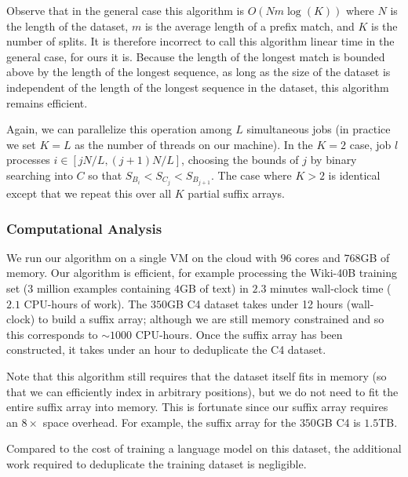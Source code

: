 Observe that in the general case this algorithm is $O(N m \log(K))$ where $N$ is the length
of the dataset, $m$ is the average length of a prefix match, and $K$ is the number of splits.
%
It is therefore incorrect to call this algorithm linear time in the general case, for ours it is.
%
Because the length of the longest match is bounded above by the length of the longest
sequence, as long as the size of the dataset is independent of the length of the 
longest sequence in the dataset, this algorithm remains efficient.

Again, we can parallelize this operation among $L$ simultaneous jobs 
(in practice we set $K=L$ as the number of threads on our machine).
%
In the $K=2$ case, job $l$ processes $i \in [jN/L, (j+1)N/L]$, choosing
the bounds of $j$ by binary searching into $C$ so that $S_{B_{i}} < S_{C_{j}} < S_{B_{j+1}}$.
%
The case where $K>2$ is identical except that we repeat this over all $K$ partial suffix arrays.


\subsubsection{Computational Analysis}
We run our algorithm on a single VM on the cloud with $96$ cores and $768$GB of memory.
Our algorithm is efficient, for example processing the Wiki-40B training set ($3$ million
examples containing $4$GB of text) in $2.3$ minutes wall-clock time ($2.1$ CPU-hours of work).
%
The $350$GB C4 dataset takes under 12 hours (wall-clock) to build a suffix array; although we are still memory constrained and so this corresponds to $\sim 1000$ CPU-hours. 
% 
Once the suffix array has been constructed, it takes under an hour to deduplicate the C4 dataset.


Note that this algorithm still requires that the dataset itself fits in memory
(so that we can efficiently index in arbitrary positions), but we do not need to fit the entire suffix array into memory.
This is fortunate since our suffix array requires an $8\times$ space overhead.
For example, the suffix array for the
$350$GB C4 is $1.5$TB.

%

Compared to the cost of training a language model on this dataset, the additional
work required to deduplicate the training dataset is negligible.








